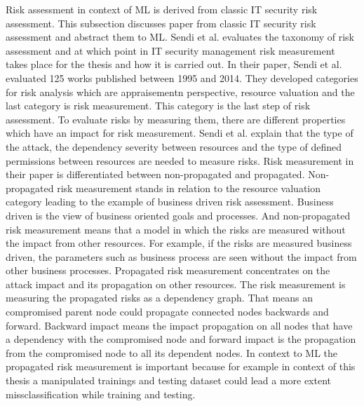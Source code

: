 Risk assessment in context of ML is derived from classic IT security risk assessment. This subsection discusses paper from classic IT security risk assessment and abstract them to ML. Sendi et al. \cite{DBLP:journals/compsec/SendiAC16} evaluates the taxonomy of risk assessment and at which point in IT security management risk measurement takes place for the thesis and how it is carried out. In their paper, Sendi et al. evaluated 125 works published between 1995 and 2014. They developed categories for risk analysis which are appraisementn perspective, resource valuation and the last category is risk measurement. This category is the last step of risk assessment. To evaluate risks by measuring them, there are different properties which have an impact for risk measurement. Sendi et al. explain that the type of the attack, the dependency severity between resources and the type of defined permissions between resources are needed to measure risks. Risk measurement in their paper is differentiated between non-propagated and propagated. Non-propagated risk measurement stands in relation to the resource valuation category leading to the example of business driven risk assessment. Business driven is the view of business oriented goals and processes. And non-propagated risk measurement means that a model in which the risks are measured without the impact from other resources. For example, if the risks are measured business driven, the parameters such as business process are seen without the impact from other business processes. Propagated risk measurement concentrates on the attack impact and its propagation on other resources. The risk measurement is measuring the propagated risks as a dependency graph. That means an compromised parent node could propagate connected nodes backwards and forward. Backward impact means the impact propagation on all nodes that have a dependency with the compromised node and forward impact is the propagation from the compromised node to all its dependent nodes. In context to ML the propagated risk measurement is important because for example in context of this thesis a manipulated trainings and testing dataset could lead a more extent missclassification while training and testing.
